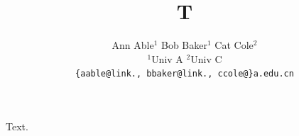 \documentclass{article}
\title{T}
\author{Ann Able$^1$ \quad Bob Baker$^1$ \quad Cat Cole$^2$\\
$^1$Univ A \quad $^2$Univ C\\
{\tt\small \{aable@link., bbaker@link., ccole@\}a.edu.cn}}
\date{}
\begin{document}
\maketitle
Text.
\end{document}
